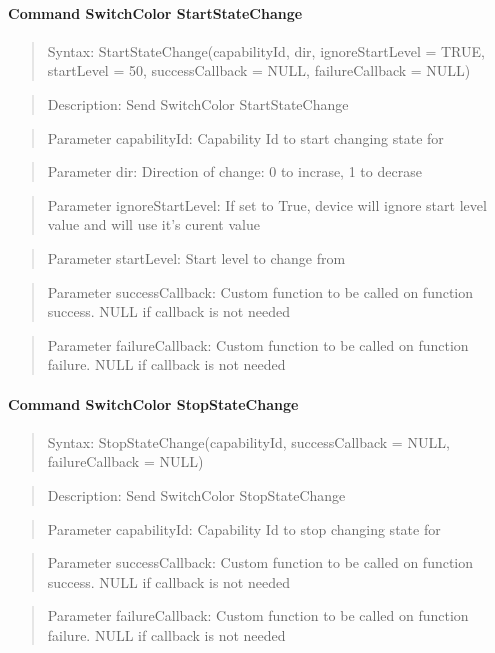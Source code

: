 \paragraph{Command SwitchColor StartStateChange}
\begin{quote}Syntax: StartStateChange(capabilityId, dir, ignoreStartLevel = TRUE, startLevel = 50, successCallback = NULL, failureCallback = NULL)\end{quote}
\begin{quote}Description: Send SwitchColor StartStateChange\end{quote}
\begin{quote}Parameter capabilityId: Capability Id to start changing state for\end{quote}
\begin{quote}Parameter dir: Direction of change: 0 to incrase, 1 to decrase\end{quote}
\begin{quote}Parameter ignoreStartLevel: If set to True, device will ignore start level value and will use it's curent value\end{quote}
\begin{quote}Parameter startLevel: Start level to change from\end{quote}
\begin{quote}Parameter successCallback: Custom function to be called on function success. NULL if callback is not needed\end{quote}
\begin{quote}Parameter failureCallback: Custom function to be called on function failure. NULL if callback is not needed\end{quote}


\paragraph{Command SwitchColor StopStateChange}
\begin{quote}Syntax: StopStateChange(capabilityId, successCallback = NULL, failureCallback = NULL)\end{quote}
\begin{quote}Description: Send SwitchColor StopStateChange\end{quote}
\begin{quote}Parameter capabilityId: Capability Id to stop changing state for\end{quote}
\begin{quote}Parameter successCallback: Custom function to be called on function success. NULL if callback is not needed\end{quote}
\begin{quote}Parameter failureCallback: Custom function to be called on function failure. NULL if callback is not needed\end{quote}




